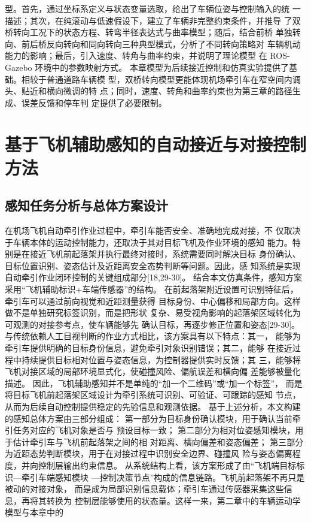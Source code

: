 型。首先，通过坐标系定义与状态变量选取，给出了车辆位姿与控制输入的统
一描述；其次，在纯滚动与低速假设下，建立了车辆非完整约束条件，并推导
了双桥转向工况下的状态方程、转弯半径表达式与曲率模型；随后，结合前桥
单独转向、前后桥反向转向和同向转向三种典型模式，分析了不同转向策略对
车辆机动能力的影响；最后，引入速度、转角与曲率约束，并说明了理论模型
在 ROS-Gazebo 环境中的参数映射方式。
本章模型为后续接近控制和仿真实验提供了基础。相较于普通道路车辆模
型，双桥转向模型更能体现机场牵引车在窄空间内调头、贴近和横向微调的特
点；同时，速度、转角和曲率约束也为第三章的路径生成、误差反馈和停车判
定提供了必要限制。










\section{基于飞机辅助感知的自动接近与对接控制方法}
\subsection{感知任务分析与总体方案设计}
在机场飞机自动牵引作业过程中，牵引车能否安全、准确地完成对接，不
仅取决于车辆本体的运动控制能力，还取决于其对目标飞机及作业环境的感知
能力。特别是在接近飞机前起落架并执行最终对接时，系统需要同时解决目标
身份确认、目标位置识别、姿态估计及近距离安全态势判断等问题。因此，感
知系统是实现自动牵引作业闭环控制的关键组成部分[18,29-30]。
结合本文仿真条件，感知方案采用“飞机辅助标识+车端传感器”的结构。
在前起落架附近设置可识别特征后，牵引车可以通过前向视觉和近距测量获得
目标身份、中心偏移和局部方向。这样做不是单独研究标签识别，而是把形状
复杂、易受视角影响的起落架区域转化为可观测的对接参考点，使车辆能够先
确认目标，再逐步修正位置和姿态[29-30]。
与传统依赖人工目视判断的作业方式相比，该方案具有以下特点：其一，
能够为牵引车提供明确的目标身份信息，避免牵引对象识别错误；其二，能够
在接近过程中持续提供目标相对位置与姿态信息，为控制器提供实时反馈；其
三，能够将飞机对接区域的局部环境显式化，使碰撞风险、偏航误差和横向偏
差能够被量化描述。
因此，飞机辅助感知并不是单纯的“加一个二维码”或“加一个标签”，
而是将目标飞机前起落架区域设计为牵引系统可识别、可验证、可跟踪的感知
节点，从而为后续自动控制提供稳定的先验信息和观测依据。
基于上述分析，本文构建的感知总体方案由三部分组成：
第一部分为目标身份确认模块，用于确认当前牵引任务对应的飞机对象是否与
预设目标一致；
第二部分为相对位姿感知模块，用于估计牵引车与飞机前起落架之间的相
对距离、横向偏差和姿态偏差；
第三部分为近距态势判断模块，用于在对接过程中识别安全边界、碰撞风
险与姿态偏离程度，并向控制层输出约束信息。
从系统结构上看，该方案形成了由“飞机端目标标识—牵引车端感知模块
—控制决策节点”构成的信息链路。飞机前起落架不再只是被动的对接对象，
而是成为局部识别信息载体；牵引车通过传感器采集这些信息，再将其转换为
控制层能够使用的状态量。这样一来，第二章中的车辆运动学模型与本章中的







